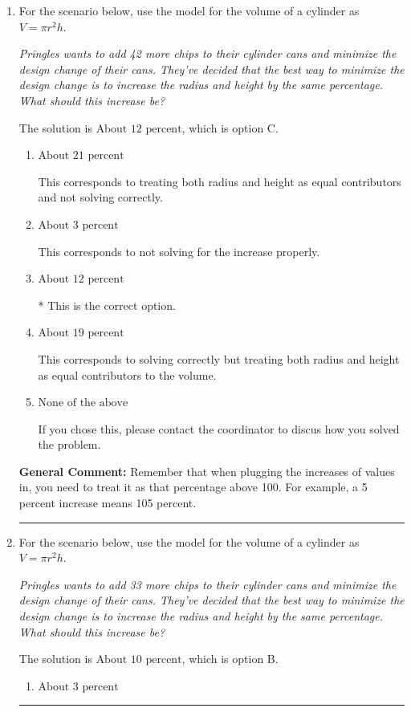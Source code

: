 \documentclass{extbook}[14pt]
\newcommand{\litem}[1]{\item #1

\rule{\textwidth}{0.4pt}}
\begin{document}
\begin{enumerate}\litem{
For the scenario below, use the model for the volume of a cylinder as $V = \pi r^2 h$.

\begin{center}
    \textit{ Pringles wants to add 42 \text{percent} more chips to their cylinder cans and minimize the design change of their cans. They've decided that the best way to minimize the design change is to increase the radius and height by the same percentage. What should this increase be? }
\end{center}
The solution is \( \text{About } 12 \text{ percent} \), which is option C.\begin{enumerate}[label=\Alph*.]
\item \( \text{About } 21 \text{ percent} \)

This corresponds to treating both radius and height as equal contributors and not solving correctly.
\item \( \text{About } 3 \text{ percent} \)

This corresponds to not solving for the increase properly.
\item \( \text{About } 12 \text{ percent} \)

* This is the correct option.
\item \( \text{About } 19 \text{ percent} \)

This corresponds to solving correctly but treating both radius and height as equal contributors to the volume.
\item \( \text{None of the above} \)

If you chose this, please contact the coordinator to discus how you solved the problem.
\end{enumerate}

\textbf{General Comment:} Remember that when plugging the increases of values in, you need to treat it as that percentage above 100. For example, a 5 percent increase means 105 percent.
}
\litem{
For the scenario below, use the model for the volume of a cylinder as $V = \pi r^2 h$.

\begin{center}
    \textit{ Pringles wants to add 33 \text{percent} more chips to their cylinder cans and minimize the design change of their cans. They've decided that the best way to minimize the design change is to increase the radius and height by the same percentage. What should this increase be? }
\end{center}
The solution is \( \text{About } 10 \text{ percent} \), which is option B.\begin{enumerate}[label=\Alph*.]
\item \( \text{About } 3 \text{ percent} \)


\end{enumerate}}
\end{enumerate}
\end{document}
